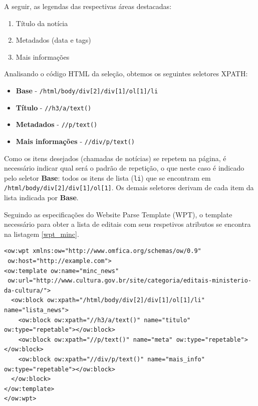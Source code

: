 A seguir, as legendas das respectivas áreas destacadas:

\begin{enumerate}
	\item Título da notícia
	\item Metadados (data e tags)
	\item Mais informações
\end{enumerate}

Analisando o código HTML da seleção, obtemos os seguintes seletores XPATH:

\begin{itemize}
	\item \textbf{Base} - \texttt{/html/body/div[2]/div[1]/ol[1]/li}
	\item \textbf{Título} - \texttt{//h3/a/text()}
	\item \textbf{Metadados} - \texttt{//p/text()}
	\item \textbf{Mais informações} - \texttt{//div/p/text()}
\end{itemize}

Como os itens desejados (chamadas de notícias) se repetem na página, é necessário indicar qual será o padrão de repetição, o que neste caso é indicado pelo seletor \textbf{Base}: todos os itens de lista (\texttt{li}) que se encontram em \texttt{/html/body/div[2]/div[1]/ol[1]}. Os demais seletores derivam de cada item da lista indicada por \textbf{Base}.

Seguindo as especificações do Website Parse Template (WPT), o template necessário para obter a lista de editais com seus respetivos atributos se encontra na listagem \ref{wpt_minc}.

\begin{lstlisting}[label=wpt_minc]
<ow:wpt xmlns:ow="http://www.omfica.org/schemas/ow/0.9"
 ow:host="http://example.com">
<ow:template ow:name="minc_news" 
 ow:url="http://www.cultura.gov.br/site/categoria/editais-ministerio-da-cultura/">
  <ow:block ow:xpath="/html/body/div[2]/div[1]/ol[1]/li" name="lista_news">
    <ow:block ow:xpath="//h3/a/text()" name="titulo" ow:type="repetable"></ow:block>
    <ow:block ow:xpath="//p/text()" name="meta" ow:type="repetable"></ow:block>
    <ow:block ow:xpath="//div/p/text()" name="mais_info" ow:type="repetable"></ow:block>
  </ow:block>
</ow:template> 
</ow:wpt>
\end{lstlisting}

